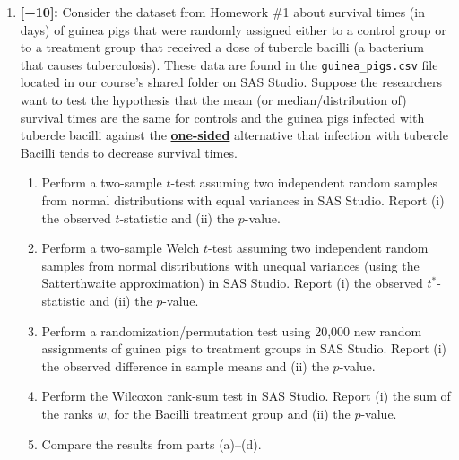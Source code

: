 \documentclass[11pt]{article}
\begin{document}
\begin{enumerate}

\item \textbf{[+10]:} Consider the dataset from Homework \#1 about survival times (in days) of guinea pigs that were randomly assigned either to a control group or to a treatment group that received a dose of tubercle bacilli (a bacterium that causes tuberculosis). These data are found in the \texttt{guinea\_pigs.csv} file located in our course's shared folder on SAS Studio. Suppose the researchers want to test the hypothesis that the mean (or median/distribution of) survival times are the same for controls and the guinea pigs infected with tubercle bacilli against the \textbf{\underline{one-sided}} alternative that infection with tubercle Bacilli tends to decrease survival times. 
	\begin{enumerate}
	\item Perform a two-sample $t$-test assuming two independent random samples from normal distributions with equal variances in SAS Studio. Report (i) the observed $t$-statistic and (ii) the $p$-value.
	\vspace{2in}
	\item Perform a two-sample Welch $t$-test assuming two independent random samples from normal distributions with unequal variances (using the Satterthwaite approximation) in SAS Studio. Report (i) the observed $t^*$-statistic and (ii) the $p$-value.
	\newpage
	\item Perform a randomization/permutation test using 20,000 new random assignments of guinea pigs to treatment groups in SAS Studio. Report (i) the observed difference in sample means and (ii) the $p$-value.
	\vspace{2in}
	\item Perform the Wilcoxon rank-sum test in SAS Studio. Report (i) the sum of the ranks $w$, for the Bacilli treatment group and (ii) the $p$-value.
	\vspace{2in}
	\item Compare the results from parts (a)--(d).
	\vspace{5in}
	\end{enumerate}


\end{enumerate}
\end{document}

